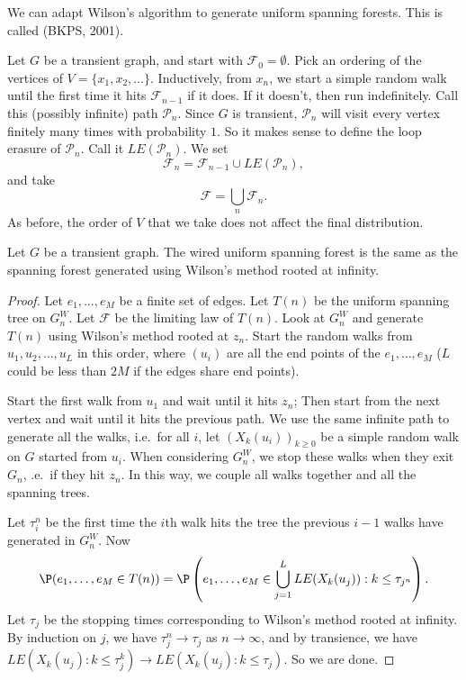 \documentclass[a4paper]{article}
\begin{document}
We can adapt Wilson's algorithm to generate uniform spanning forests. This is called  (BKPS, 2001).

Let $G$ be a transient graph, and start with $\mathcal{F}_0 = \emptyset$. Pick an ordering of the vertices of $V = \{x_1, x_2, \ldots\}$. Inductively, from $x_n$, we start a simple random walk until the first time it hits $\mathcal{F}_{n - 1}$ if it does. If it doesn't, then run indefinitely. Call this (possibly infinite) path $\mathcal{P}_n$. Since $G$ is transient, $\mathcal{P}_n$ will visit every vertex finitely many times with probability $1$. So it makes sense to define the loop erasure of $\mathcal{P}_n$. Call it $LE(\mathcal{P}_n)$. We set
\[
  \mathcal{F}_n = \mathcal{F}_{n - 1} \cup LE(\mathcal{P}_n),
\]
and take
\[
  \mathcal{F} = \bigcup_n \mathcal{F}_n.
\]
As before, the order of $V$ that we take does not affect the final distribution.
\begin{prop}
  Let $G$ be a transient graph. The wired uniform spanning forest is the same as the spanning forest generated using Wilson's method rooted at infinity.
\end{prop}

\begin{proof}
  Let $e_1, \ldots, e_M$ be a finite set of edges. Let $T(n)$ be the uniform spanning tree on $G_n^W$. Let $\mathcal{F}$ be the limiting law of $T(n)$. Look at $G_n^W$ and generate $T(n)$ using Wilson's method rooted at $z_n$. Start the random walks from $u_1, u_2, \ldots, u_L$ in this order, where $(u_i)$ are all the end points of the $e_1, \ldots, e_M$ ($L$ could be less than $2M$ if the edges share end points).

  Start the first walk from $u_1$ and wait until it hits $z_n$; Then start from the next vertex and wait until it hits the previous path. We use the same infinite path to generate all the walks, i.e.\ for all $i$, let $(X_k(u_i))_{k \geq 0}$ be a simple random walk on $G$ started from $u_i$. When considering $G_n^W$, we stop these walks when they exit $G_n$, .e.\ if they hit $z_n$. In this way, we couple all walks together and all the spanning trees.

  Let $\tau_i^n$ be the first time the $i$th walk hits the tree the previous $i - 1$ walks have generated in $G_n^W$. Now
  \[
    \P(e_1, \ldots, e_M \in T(n)) = \P\left(e_1, \ldots, e_M \in \bigcup_{j = 1}^L LE(X_k(u_j)) : k \leq \tau_{j^n} \right).
  \]
  Let $\tau_j$ be the stopping times corresponding to Wilson's method rooted at infinity. By induction on $j$, we have $\tau_j^n \to \tau_j$ as $n \to \infty$, and by transience, we have $LE(X_k(u_j): k \leq \tau_j^k) \to LE(X_k(u_j): k \leq \tau_j)$. So we are done.
\end{proof}
\end{document}
